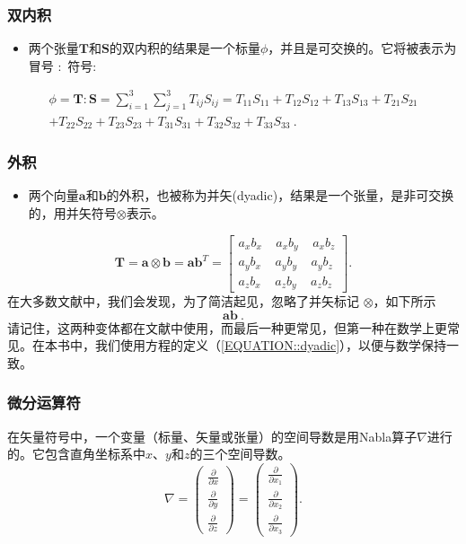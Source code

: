 \documentclass[LBMDerivation.tex]{subfiles}
\begin{document}
\subsubsection{双内积}
%
%
\begin{itemize}
   \item 两个张量$\textbf{T}$和$\textbf{S}$的双内积的结果是一个标量$\phi$，并且是可交换的。它将被表示为冒号 $\boldsymbol \colon$ 符号:
\end{itemize}
%
%
\begin{multline}
 \phi = \textbf{T} \boldsymbol \colon \textbf{S} = \sum_{i=1}^{3}\sum_{j=1}^{3} T_{ij} S_{ij}
=
 T_{11} S_{11} + T_{12} S_{12} + T_{13} S_{13} + T_{21} S_{21} \\
+
 T_{22} S_{22} +
 T_{23} S_{23} + T_{31} S_{31} + T_{32} S_{32} + T_{33} S_{33} ~.
\label{EQUATION::doubleInnerProduct}
\end{multline}
%
%
%
%
\subsubsection{外积}
%
%
\begin{itemize}
    \item 两个向量$\textbf{a}$和$\textbf{b}$的外积，也被称为并矢(dyadic)，结果是一个张量，是非可交换的，用并矢符号$\otimes$表示。
\end{itemize}
%
%
%
\begin{equation}
  \textbf{T} = \textbf{a} \otimes \textbf{b} = \textbf{a} \textbf{b}^T =   \left[
  \begin{matrix}
   a_xb_x ~ ~ ~ ~ ~ a_xb_y ~ ~ ~ ~ ~ a_xb_z \\
   a_yb_x ~ ~ ~ ~ ~ a_yb_y ~ ~ ~ ~ ~ a_yb_z \\
   a_zb_x ~ ~ ~ ~ ~ a_zb_y ~ ~ ~ ~ ~ a_zb_z
  \end{matrix}
  \right].
   \label{EQUATION::dyadic}
\end{equation}
%
%
	在大多数文献中，我们会发现，为了简洁起见，忽略了并矢标记 $\otimes$，如下所示
%
%
\begin{equation}
  \textbf{a}\textbf{b}~.
  \label{EQUATION::outerProduct}
\end{equation}
%
%
	请记住，这两种变体都在文献中使用，而最后一种更常见，但第一种在数学上更常见。在本书中，我们使用方程的定义（\ref{EQUATION::dyadic}），以便与数学保持一致。
%
%
%
%
\subsubsection{微分运算符}
%
%
	在矢量符号中，一个变量（标量、矢量或张量）的空间导数是用Nabla算子$\nabla$进行的。它包含直角坐标系中$x$、$y$和$z$的三个空间导数。
%
%
$$
  \nabla
=
  \left(
  \begin{matrix}
    \frac{\partial}{\partial x} \\
    \frac{\partial}{\partial y} \\
    \frac{\partial}{\partial z}
  \end{matrix}
  \right)
=
  \left(
  \begin{matrix}
    \frac{\partial}{\partial x_1} \\
    \frac{\partial}{\partial x_2} \\
    \frac{\partial}{\partial x_3}
  \end{matrix}
  \right) .
$$
%
%
%
%
\end{document}
